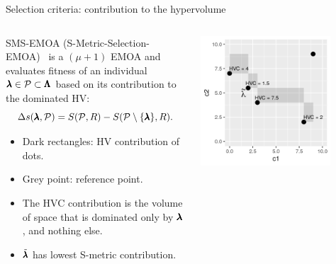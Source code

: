 \begin{frame}[allowframebreaks]{Selection criteria: contribution to the hypervolume}

\begin{columns}
\begin{column}{0.5\textwidth}
SMS-EMOA (S-Metric-Selection-EMOA)~ is a $(\mu+1)$ EMOA and evaluates fitness of an individual $\pmb{\lambda} \in \mathcal{P} \subset \pmb{\Lambda}$ based on its contribution to the dominated HV:
$$
\Delta s(\pmb{\lambda}, \mathcal{P}) = S(\mathcal{P}, R) - S(\mathcal{P} \setminus \{ \pmb{\lambda}\}, R).
$$

\begin{itemize}
\item Dark rectangles: HV contribution of dots.
\item Grey point: reference point.
\item The HVC contribution is the volume of space that is dominated only by $\pmb{\lambda}$, and nothing else.
\item $\tilde{\pmb{\lambda}}$ has lowest S-metric contribution.
\end{itemize}
\end{column}

\begin{column}{0.5\textwidth}
\begin{center}
\includegraphics[width = 0.8\textwidth]{images/hv_contrib.png}
\end{center}
\end{column}
\end{columns}


\end{frame}
